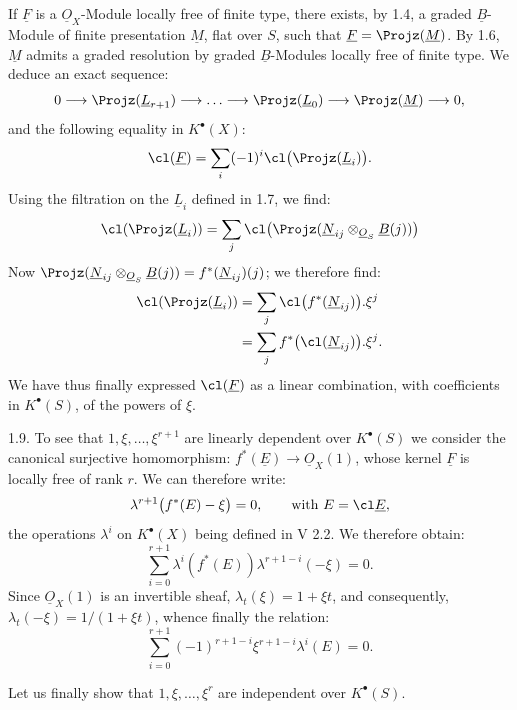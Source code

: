 If \(\underline{F}\) is a \(\underline{O}_X\)-Module locally free of finite type, there exists, by 1.4, a graded \(\underline{B}\)-Module of finite presentation \(\underline{M}\), flat over \(S\), such that \(\underline{F}=\Projz(\underline{M})\). By 1.6, \(\underline{M}\) admits a graded resolution by graded \(\underline{B}\)-Modules locally free of finite type. We deduce an exact sequence:
%
\[
  0\longrightarrow \Projz(\underline{L}_{r+1})\longrightarrow\ldots\longrightarrow
  \Projz(\underline{L}_0)\longrightarrow\Projz(\underline{M})\longrightarrow 0,
\]
and the following equality in \(K^{\bullet}(X)\):
\[
  \cl(\underline{F})=\sum_i(-1)^i\cl\bigl(\Projz(\underline{L}_i)\bigr).
\]
Using the filtration on the \(\underline{L}_i\) defined in 1.7, we find:
\[
  \cl(\Projz(\underline{L}_i))=\sum_j \cl\bigl(\Projz(\underline{N}_{ij}\otimes_{\underline{O}_S}\underline{B}(j))\bigr)
\]
Now \(\Projz(\underline{N}_{ij}\otimes_{\underline{O}_S}\underline{B}(j))=f^*(\underline{N}_{ij})(j)\); we therefore find:
\[
\begin{aligned}
  \cl(\Projz(\underline{L}_i))
  &=\sum_j \cl\bigl(f^*(\underline{N}_{ij})\bigr).\xi^j \\
  &=\sum_j f^*\bigl(\cl(\underline{N}_{ij})\bigr).\xi^j.
\end{aligned}
\]
We have thus finally expressed \(\cl(\underline{F})\) as a linear combination, with coefficients in \(K^{\bullet}(S)\), of the powers of \(\xi\).

1.9. To see that \(1,\xi,\ldots,\xi^{r+1}\) are linearly dependent over \(K^{\bullet}(S)\) we consider the canonical surjective homomorphism: \(f^*(\underline{E})\to\underline{O}_X(1)\), whose kernel \(\underline{F}\) is locally free of rank \(r\). We can therefore write:
\[
  \lambda^{r+1}\bigl(f^*(E)-\xi\bigr)=0,
  \qquad \text{with } E=\cl\underline{E},
\]
the operations \(\lambda^i\) on \(K^{\bullet}(X)\) being defined in V 2.2. We therefore obtain:
\[
  \sum_{i=0}^{r+1}\lambda^i(f^*(E))\lambda^{r+1-i}(-\xi)=0.
\]
Since \(\underline{O}_X(1)\) is an invertible sheaf, \(\lambda_t(\xi)=1+\xi t\), and consequently, \(\lambda_t(-\xi)=1/(1+\xi t)\), whence finally the relation:
\begin{equation}\tag{1.9.1}
  \sum_{i=0}^{r+1}(-1)^{r+1-i}\xi^{r+1-i}\lambda^i(E)=0.
\end{equation}

Let us finally show that \(1,\xi,\ldots,\xi^r\) are independent over \(K^{\bullet}(S)\).

